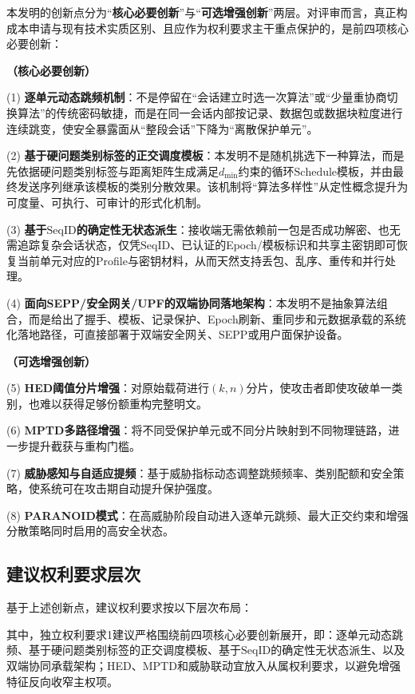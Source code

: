 ﻿\documentclass[12pt,a4paper]{article}
\begin{document}
本发明的创新点分为“\textbf{核心必要创新}”与“\textbf{可选增强创新}”两层。对评审而言，真正构成本申请与现有技术实质区别、且应作为权利要求主干重点保护的，是前四项核心必要创新：

\textbf{（核心必要创新）}

(1) \textbf{逐单元动态跳频机制}：不是停留在“会话建立时选一次算法”或“少量重协商切换算法”的传统密码敏捷，而是在同一会话内部按记录、数据包或数据块粒度进行连续跳变，使安全暴露面从“整段会话”下降为“离散保护单元”。

(2) \textbf{基于硬问题类别标签的正交调度模板}：本发明不是随机挑选下一种算法，而是先依据硬问题类别标签与距离矩阵生成满足$d_{\min}$约束的循环$\text{Schedule}$模板，并由最终发送序列继承该模板的类别分散效果。该机制将“算法多样性”从定性概念提升为可度量、可执行、可审计的形式化机制。

(3) \textbf{基于$\text{SeqID}$的确定性无状态派生}：接收端无需依赖前一包是否成功解密、也无需追踪复杂会话状态，仅凭$\text{SeqID}$、已认证的Epoch/模板标识和共享主密钥即可恢复当前单元对应的Profile与密钥材料，从而天然支持丢包、乱序、重传和并行处理。

(4) \textbf{面向SEPP/安全网关/UPF的双端协同落地架构}：本发明不是抽象算法组合，而是给出了握手、模板、记录保护、Epoch刷新、重同步和元数据承载的系统化落地路径，可直接部署于双端安全网关、SEPP或用户面保护设备。

\textbf{（可选增强创新）}

(5) \textbf{HED阈值分片增强}：对原始载荷进行$(k,n)$分片，使攻击者即使攻破单一类别，也难以获得足够份额重构完整明文。

(6) \textbf{MPTD多路径增强}：将不同受保护单元或不同分片映射到不同物理链路，进一步提升截获与重构门槛。

(7) \textbf{威胁感知与自适应提频}：基于威胁指标动态调整跳频频率、类别配额和安全策略，使系统可在攻击期自动提升保护强度。

(8) \textbf{PARANOID模式}：在高威胁阶段自动进入逐单元跳频、最大正交约束和增强分散策略同时启用的高安全状态。

\subsection*{建议权利要求层次}

基于上述创新点，建议权利要求按以下层次布局：

其中，独立权利要求1建议严格围绕前四项核心必要创新展开，即：逐单元动态跳频、基于硬问题类别标签的正交调度模板、基于$\text{SeqID}$的确定性无状态派生、以及双端协同承载架构；HED、MPTD和威胁联动宜放入从属权利要求，以避免增强特征反向收窄主权项。
\end{document}
